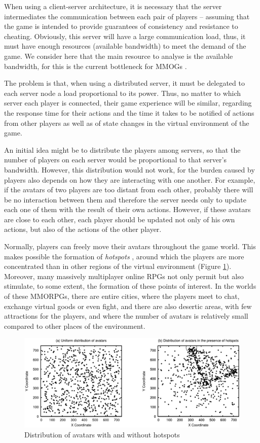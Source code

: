 When using a client-server architecture, it is necessary that the server intermediates the communication between each pair of players -- assuming that the game is intended to provide guarantees of consistency and resistance to cheating. Obviously, this server will have a large communication load, thus, it must have enough resources (available bandwidth) to meet the demand of the game. We consider here that the main resource to analyse is the available bandwidth, for this is the current bottleneck for MMOGs \cite{feng2007wnn}.

The problem is that, when using a distributed server, it must be delegated to each server node a load proportional to its power. Thus, no matter to which server each player is connected, their game experience will be similar, regarding the response time for their actions and the time it takes to be notified of actions from other players as well as of state changes in the virtual environment of the game.
	
An initial idea might be to distribute the players among servers, so that the number of players on each server would be proportional to that server's bandwidth. However, this distribution would not work, for the burden caused by players also depends on how they are interacting with one another. For example, if the avatars of two players are too distant from each other, probably there will be no interaction between them and therefore the server needs only to update each one of them with the result of their own actions. However, if these avatars are close to each other, each player should be updated not only of his own actions, but also of the actions of the other player.
	
Normally, players can freely move their avatars throughout the game world. This makes possible the formation of \emph{hotspots} \cite{ahmed2008mol}, around which the players are more concentrated than in other regions of the virtual environment (Figure \ref{fig:avatarsdistribution}). Moreover, many massively multiplayer online RPGs not only permit but also stimulate, to some extent, the formation of these points of interest. In the worlds of these MMORPGs, there are entire cities, where the players meet to chat, exchange virtual goods or even fight, and there are also desertic areas, with few attractions for the players, and where the number of avatars is relatively small compared to other places of the environment.

\begin{figure}
  \centering
  \includegraphics[width=1.0\linewidth]{images/avatarsdistribution}
  \caption{Distribution of avatars with and without hotspots}
  \label{fig:avatarsdistribution}
\end{figure}

